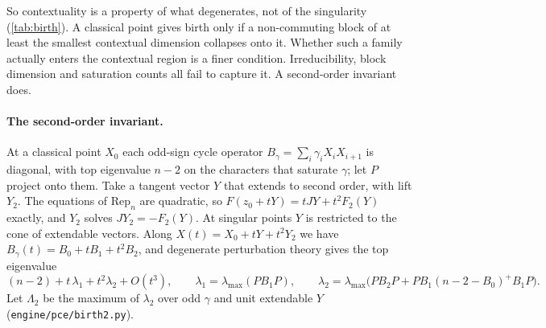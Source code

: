 \documentclass[11pt]{article}
\theoremstyle{definition}\newtheorem{definition}[theorem]{Definition}\newtheorem{remark}[theorem]{Remark}\newtheorem{example}[theorem]{Example}
\begin{document}
\begin{table}[!htbp]\centering\small
{}
\caption{Where contextuality is born, CHSH against KCBS. Birth requires a large enough block degenerating onto the classical point, is
independent of singularity, and is detected at second order by $\Lambda_2$ (\cref{prop:lambda2}).}\label{tab:birth}
\end{table}

So contextuality is a property of what degenerates, not of the singularity (\cref{tab:birth}). A classical point gives birth only if a
non-commuting block of at least the smallest contextual dimension collapses onto it. Whether such a family actually enters the contextual
region is a finer condition. Irreducibility, block dimension and saturation counts all fail to capture it. A second-order invariant does.

\paragraph{The second-order invariant.}
At a classical point $X_0$ each odd-sign cycle operator $B_\gamma=\sum_i\gamma_iX_iX_{i+1}$ is diagonal, with top eigenvalue $n-2$ on the
characters that saturate $\gamma$; let $P$ project onto them. Take a tangent vector $Y$ that extends to second order, with lift $Y_2$. The
equations of $\mathrm{Rep}_n$ are quadratic, so $F(z_0+tY)=tJY+t^2F_2(Y)$ exactly, and $Y_2$ solves $JY_2=-F_2(Y)$. At singular points $Y$
is restricted to the cone of extendable vectors. Along $X(t)=X_0+tY+t^2Y_2$ we have $B_\gamma(t)=B_0+tB_1+t^2B_2$, and degenerate
perturbation theory gives the top eigenvalue
\[(n-2)+t\,\lambda_1+t^2\lambda_2+O(t^3),\qquad \lambda_1=\lambda_{\max}(PB_1P),\qquad
\lambda_2=\lambda_{\max}\bigl(PB_2P+PB_1(n-2-B_0)^+B_1P\bigr).\]
Let $\Lambda_2$ be the maximum of $\lambda_2$ over odd $\gamma$ and unit extendable $Y$ (\texttt{engine/pce/birth2.py}).
\end{document}
